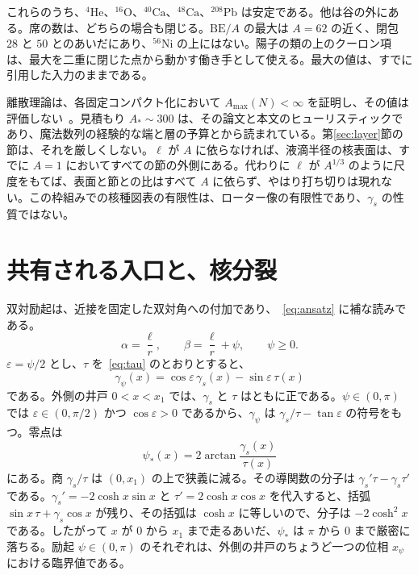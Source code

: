 \documentclass[a4paper]{article}
\begin{document}
これらのうち、\({}^{4}\mathrm{He}\)、\({}^{16}\mathrm{O}\)、\({}^{40}\mathrm{Ca}\)、\({}^{48}\mathrm{Ca}\)、\({}^{208}\mathrm{Pb}\) は安定である。他は谷の外にある。席の数は、どちらの場合も閉じる。\(\mathrm{BE}/A\) の最大は \(A=62\) の近く、閉包 \(28\) と \(50\) とのあいだにあり、\({}^{56}\mathrm{Ni}\) の上にはない。陽子の類の上のクーロン項は、最大を二重に閉じた点から動かす働き手として使える。最大の値は、すでに引用した入力のままである。

離散理論は、各固定コンパクト化において \(A_{\max}(N)<\infty\) を証明し、その値は評価しない~\cite{dst-dio}。見積もり \(A_*\sim 300\) は、その論文と本文のヒューリスティックであり、魔法数列の経験的な端と層の予算とから読まれている。第\ref{sec:layer}節の節は、それを厳しくしない。\(\ell\) が \(A\) に依らなければ、液滴半径の核表面は、すでに \(A=1\) においてすべての節の外側にある。代わりに \(\ell\) が \(A^{1/3}\) のように尺度をもてば、表面と節との比はすべて \(A\) に依らず、やはり打ち切りは現れない。この枠組みでの核種図表の有限性は、ローター像の有限性であり、\(\gamma_s\) の性質ではない。

\section{共有される入口と、核分裂}
\label{sec:fission}

双対励起は、近接を固定した双対角への付加であり、~\eqref{eq:ansatz} に補な読みである。
\begin{equation}
\label{eq:dual-ansatz}
\alpha=\frac{\ell}{r},
\qquad
\beta=\frac{\ell}{r}+\psi,
\qquad
\psi\ge 0.
\end{equation}
\(\varepsilon=\psi/2\) とし、\(\tau\) を~\eqref{eq:tau} のとおりとすると、
\begin{equation}
\label{eq:gamma-psi}
\gamma_\psi(x)
  =\cos\varepsilon\,\gamma_s(x)-\sin\varepsilon\,\tau(x)
\end{equation}
である。外側の井戸 \(0<x<x_1\) では、\(\gamma_s\) と \(\tau\) はともに正である。\(\psi\in(0,\pi)\) では \(\varepsilon\in(0,\pi/2)\) かつ \(\cos\varepsilon>0\) であるから、\(\gamma_\psi\) は \(\gamma_s/\tau-\tan\varepsilon\) の符号をもつ。零点は
\begin{equation}
\label{eq:psi-star}
\psi_*(x)=2\arctan\frac{\gamma_s(x)}{\tau(x)}
\end{equation}
にある。商 \(\gamma_s/\tau\) は \((0,x_1)\) の上で狭義に減る。その導関数の分子は \(\gamma_s'\tau-\gamma_s\tau'\) である。\(\gamma_s'=-2\cosh x\sin x\) と \(\tau'=2\cosh x\cos x\) を代入すると、括弧 \(\sin x\,\tau+\gamma_s\cos x\) が残り、その括弧は \(\cosh x\) に等しいので、分子は \(-2\cosh^{2}x\) である。したがって \(x\) が \(0\) から \(x_1\) まで走るあいだ、\(\psi_*\) は \(\pi\) から \(0\) まで厳密に落ちる。励起 \(\psi\in(0,\pi)\) のそれぞれは、外側の井戸のちょうど一つの位相 \(x_\psi\) における臨界値である。
\end{document}
